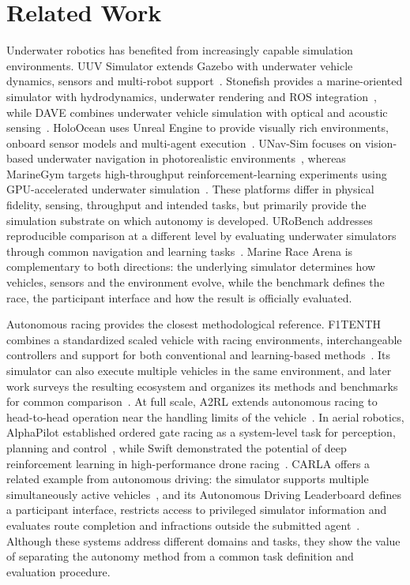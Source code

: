 \section{Related Work}
\label{sec:related_work}

Underwater robotics has benefited from increasingly capable simulation
environments. UUV Simulator extends Gazebo with underwater vehicle dynamics,
sensors and multi-robot support~\cite{manhas2016uuvsim}. Stonefish provides a
marine-oriented simulator with hydrodynamics, underwater rendering and ROS
integration~\cite{cieslak2019stonefish}, while DAVE combines underwater vehicle
simulation with optical and acoustic sensing~\cite{zhang2022dave}. HoloOcean
uses Unreal Engine to provide visually rich environments, onboard sensor models
and multi-agent execution~\cite{potokar2024holoocean}. UNav-Sim focuses on
vision-based underwater navigation in photorealistic
environments~\cite{amer2023unavsim}, whereas MarineGym targets high-throughput
reinforcement-learning experiments using GPU-accelerated underwater
simulation~\cite{chu2025marinegym}. These platforms differ in physical fidelity,
sensing, throughput and intended tasks, but primarily provide the simulation
substrate on which autonomy is developed. URoBench addresses reproducible
comparison at a different level by evaluating underwater simulators through
common navigation and learning tasks~\cite{huang2024urobench}. Marine Race Arena
is complementary to both directions: the underlying simulator determines how
vehicles, sensors and the environment evolve, while the benchmark defines the
race, the participant interface and how the result is officially evaluated.

Autonomous racing provides the closest methodological reference. F1TENTH
combines a standardized scaled vehicle with racing environments, interchangeable
controllers and support for both conventional and learning-based
methods~\cite{okelly2020f1tenth}. Its simulator can also execute multiple
vehicles in the same environment, and later work surveys the resulting ecosystem
and organizes its methods and benchmarks for common
comparison~\cite{evans2024f1tenth}. At full scale, A2RL extends autonomous
racing to head-to-head operation near the handling limits of the
vehicle~\cite{hoffmann2026a2rl}. In aerial robotics, AlphaPilot established
ordered gate racing as a system-level task for perception, planning and
control~\cite{foehn2020alphapilot,foehn2022alphapilot}, while Swift demonstrated
the potential of deep reinforcement learning in high-performance drone
racing~\cite{kaufmann2023swift}. CARLA offers a related example from autonomous
driving: the simulator supports multiple simultaneously active
vehicles~\cite{dosovitskiy2017carla}, and its Autonomous Driving Leaderboard
defines a participant interface, restricts access to privileged simulator
information and evaluates route completion and infractions outside the submitted
agent~\cite{carlaLeaderboard2026}. Although these systems address different
domains and tasks, they show the value of separating the autonomy method from a
common task definition and evaluation procedure.


